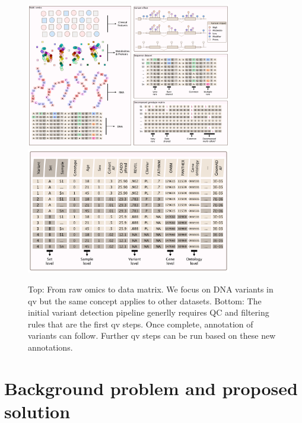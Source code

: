 \begin{figure}[h!]
    \centering
   \includegraphics[width=0.8\textwidth]{./images/candidate_variants_sequence_to_matrix_pink.pdf}
      \includegraphics[width=0.8\textwidth]{./images/candidate_variants_sequence_annotation_pink.pdf}
    \caption{Top: From raw omics to data matrix.  We focus on DNA variants in \ac{qv} but the same concept applies to other datasets.
    Bottom: The initial variant detection pipeline generlly requires QC and filtering rules that are the first \ac{qv} steps. Once complete, annotation of variants can follow. Further \ac{qv} steps can be run based on these new annotations.}
        \label{fig:candidate_variants_sequence_annotation}
\end{figure}

\section{Background problem and proposed solution}

